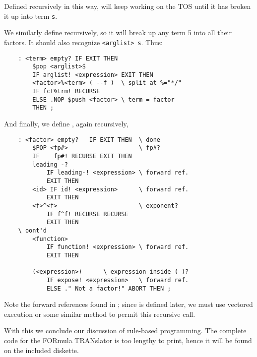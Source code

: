 Defined recursively in this way,  will keep working on the TOS until it has broken it up into term \texttt{s}.

We similarly define  recursively, so it will break up any term 5 into all their factors. It should also recognize \texttt{<arglist> s}. Thus:

\begin{lstlisting}
    : <term> empty? IF EXIT THEN
        $pop <arglist>$
        IF arglist! <expression> EXIT THEN
        <factor>%<term> ( --f )  \ split at %="*/"
        IF fct%trm! RECURSE
        ELSE .NOP $push <factor> \ term = factor
        THEN ;
\end{lstlisting}

And finally, we define , again recursively,

\begin{lstlisting}
    : <factor> empty?   IF EXIT THEN  \ done
        $POP <fp#>                    \ fp#?
        IF    fp#! RECURSE EXIT THEN
        leading -?
            IF leading-! <expression> \ forward ref.
            EXIT THEN
        <id> IF id! <expression>      \ forward ref.
            EXIT THEN
        <f>^<f>                       \ exponent?
            IF f^f! RECURSE RECURSE
            EXIT THEN
    \ oont'd
        <function>
            IF function! <expression> \ forward ref.
            EXIT THEN

        (<expression>)      \ expression inside ( )?
            IF expose! <expression>   \ forward ref.
            ELSE ." Not a factor!" ABORT THEN ;
\end{lstlisting}

\leftbar[1\linewidth]
Note the forward references found in ; since  is defined later, we must use vectored execution or some similar method to permit this recursive call.
\endleftbar

With this we conclude our discussion of rule-based programming. The complete code for the FORmula TRANslator is too lengthy to print, hence it will be found on the included diskette.